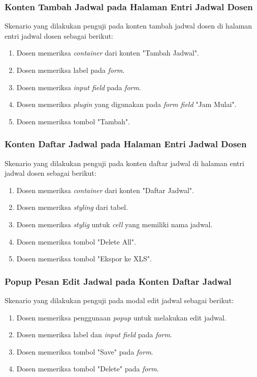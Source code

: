 \subsubsection{Konten Tambah Jadwal pada Halaman Entri Jadwal Dosen}
Skenario yang dilakukan penguji pada konten tambah jadwal dosen di halaman entri jadwal dosen sebagai berikut:
\begin{enumerate}
	\item Dosen memeriksa \textit{container} dari konten "Tambah Jadwal".	
	\item Dosen memeriksa label pada \textit{form}. 
	\item Dosen memeriksa \textit{input field} pada \textit{form}.
	\item Dosen memeriksa \textit{plugin} yang digunakan pada \textit{form field} "Jam Mulai".
	\item Dosen memeriksa tombol "Tambah".
\end{enumerate}

\subsubsection{Konten Daftar Jadwal pada Halaman Entri Jadwal Dosen}
Skenario yang dilakukan penguji pada konten daftar jadwal di halaman entri jadwal dosen sebagai berikut:
\begin{enumerate}
	\item Dosen memeriksa \textit{container} dari konten "Daftar Jadwal".
	\item Dosen memeriksa \textit{styling} dari tabel.	
	\item Dosen memeriksa \textit{stylig} untuk \textit{cell} yang memiliki nama jadwal.			
	\item Dosen memeriksa tombol "Delete All".
	\item Dosen memeriksa tombol "Ekspor ke XLS".
\end{enumerate}

\subsubsection{Popup Pesan Edit Jadwal pada Konten Daftar Jadwal}
Skenario yang dilakukan penguji pada modal edit jadwal sebagai berikut:
\begin{enumerate}
	\item Dosen memeriksa penggunaan \textit{popup} untuk melakukan edit jadwal.
	\item Dosen memeriksa label dan \textit{input field} pada \textit{form}. 
	\item Dosen memeriksa tombol "Save" pada \textit{form}.
	\item Dosen memeriksa tombol "Delete" pada \textit{form}.
\end{enumerate}

